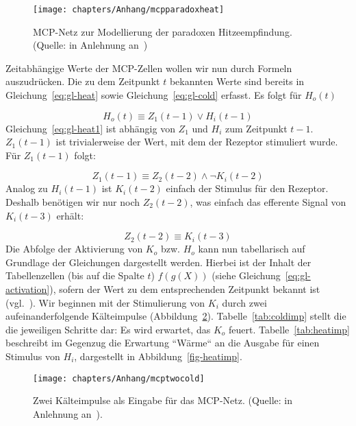 \begin{figure}[h]
    \centering
    \texttt{[image: chapters/Anhang/mcpparadoxheat]}
    \caption{MCP-Netz zur Modellierung der paradoxen Hitzeempfindung. (Quelle: in Anlehnung an~\cite[31, Figure 1.18]{Fau94})}
    \label{fig-mcpheat}
\end{figure}


\noindent
Zeitabhängige Werte der MCP-Zellen wollen wir nun durch Formeln auszudrücken.
Die zu dem Zeitpunkt $t$ bekannten Werte sind bereits in Gleichung~\ref{eq:gl-heat} sowie Gleichung~\ref{eq:gl-cold} erfasst.
\noindent
Es folgt für $H_o(t)$

\begin{equation}
    H_o(t) \equiv Z_1(t-1) \lor H_i(t-1)
    \label{eq:gl-heat1}
\end{equation}
\noindent
Gleichung~\ref{eq:gl-heat1} ist abhängig von $Z_1$ und $H_i$ zum Zeitpunkt $t - 1$. $Z_1(t-1)$ ist trivialerweise der Wert, mit dem der Rezeptor stimuliert wurde. Für $Z_1(t-1)$ folgt:

\begin{equation}
    Z_1(t - 1) \equiv Z_2(t-2) \land \neg K_i(t-2)
    \label{eq:gl-z1}
\end{equation}
\noindent
Analog zu $H_i(t - 1)$ ist $K_i(t - 2)$ einfach der Stimulus für den Rezeptor.
Deshalb benötigen wir nur noch $Z_2(t-2)$, was einfach das efferente Signal von $K_i(t-3)$ erhält:

\begin{equation}
    Z_2(t-2) \equiv K_i(t-3)
    \label{eq:gl-z2}
\end{equation}
\noindent
Die Abfolge der Aktivierung von $K_o$ bzw. $H_o$ kann nun tabellarisch auf Grundlage der Gleichungen dargestellt werden.
Hierbei ist der Inhalt der Tabellenzellen (bis auf die Spalte $t$) $f(g(X))$  (siehe Gleichung~\ref{eq:gl-activation}), sofern der Wert zu dem entsprechenden Zeitpunkt bekannt ist (vgl.~\cite[32 f.]{Fau94}).
\noindent
Wir beginnen mit der Stimulierung von $K_i$ durch zwei aufeinanderfolgende Kälteimpulse (Abbildung~\ref{fig-coldimp}). Tabelle~\ref{tab:coldimp} stellt die die jeweiligen Schritte dar: Es wird erwartet, das $K_o$ feuert. Tabelle~\ref{tab:heatimp} beschreibt im Gegenzug die Erwartung ``Wärme`` an die Ausgabe für einen Stimulus von $H_i$, dargestellt in Abbildung~\ref{fig-heatimp}.

\begin{figure}[h]
    \begin{center}
    \texttt{[image: chapters/Anhang/mcptwocold]}
    \caption{Zwei Kälteimpulse als Eingabe für das MCP-Netz. (Quelle: in Anlehnung an~\cite[35, Figure 1.23]{Fau94}).}
    \end{center}
    \label{fig-coldimp}
\end{figure}





